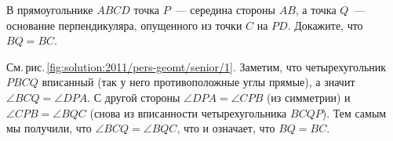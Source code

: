В прямоугольнике $ABCD$ точка $P$~--- середина стороны $AB$, а точка
$Q$~--- основание перпендикуляра, опущенного из точки $C$ на $PD$.
Докажите, что $BQ = BC$.

%
\label{solution:2011/pers-geomt/senior/1}%
См.\,рис.\,\ref{fig:solution:2011/pers-geomt/senior/1}.
Заметим, что четырехугольник $PBCQ$ вписанный
(так у него противоположные углы прямые),
а значит $\angle BCQ = \angle DPA$.
С другой стороны $\angle DPA = \angle CPB$ (из симметрии) и
$\angle CPB = \angle BQC$ (снова из вписанности четырехугольника $BCQP$).
Тем самым мы получили, что $\angle BCQ = \angle BQC$, что и означает, что
$BQ = BC$.

